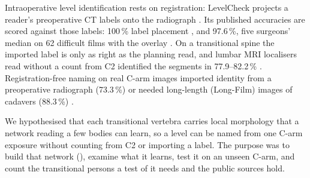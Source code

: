 Intraoperative level identification rests on registration: LevelCheck projects a reader's preoperative CT labels
onto the radiograph \citep{levelcheck2012,levelcheck2016}. Its published accuracies are
scored against those labels: 100\,\% label placement \citep{desilva2016}, and 97.6\,\%, five surgeons' median on 62
difficult films with the overlay \citep{manbachi2018}. On a transitional spine the imported
label is only as right as the planning read, and lumbar MRI localisers read without a count from C2 identified the segments in 77.9--82.2\,\% \citep{peh1999}. Registration-free naming on real C-arm images
imported identity from a preoperative radiograph (73.3\,\%) \citep{zhang2023vdvm} or needed long-length (Long-Film)
images of cadavers (88.3\,\%) \citep{huang2022}.

We hypothesised that each transitional vertebra carries local morphology that a network reading a few bodies
can learn, so a level can be named from one C-arm exposure without counting from C2 or importing a label.
The purpose was to build that network (\netname{}), examine what it learns, test it on an unseen C-arm, and
count the transitional persons a test of it needs and the public sources hold.
